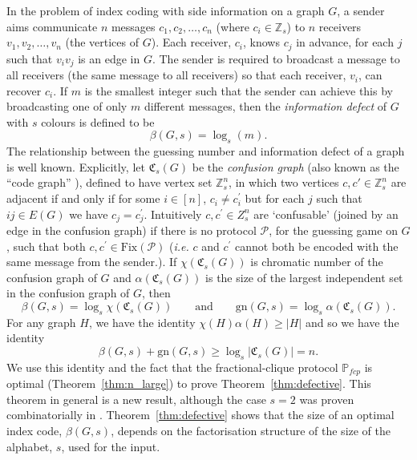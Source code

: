 \documentclass{birkjour}
\theoremstyle{indenteddefinition}
\theoremstyle{indenteddefinition}
\numberwithin{equation}{section}
\newcommand{\C}{\mathfrak{C}}
\renewcommand{\P}{\mathbb{P}}
\renewcommand{\Pr}{\mathcal{P}}
\newcommand{\Z}{\mathbb{Z}}
\newcommand{\gn}{\mbox{gn}}
\newcommand{\Fix}{\mbox{Fix}}
\renewcommand{\b}{\beta}
\begin{document}
In the problem of index coding with side information on a graph $G$, a sender aims communicate $n$ messages $c_1,c_2, \ldots ,c_n$ (where $c_i \in \Z_s$) to $n$ receivers $v_1,v_2, \ldots ,v_n$ (the vertices of $G$). Each receiver, $c_i$, knows $c_j$ in advance, for each $j$ such that $v_iv_j$ is an edge in $G$. The sender is required to broadcast a message to all receivers (the same message to all receivers) so that each receiver, $v_i$, can recover $c_i$. If $m$ is the smallest integer such that the sender can achieve this by broadcasting one of only $m$ different messages, then the \emph{information defect} \cite{Riis2007graph} of $G$ with $s$ colours is defined to be 
	$$ \b(G,s)  = \log_s(m). $$
The relationship between the guessing number and information defect of a graph is well known. 
Explicitly, let $\C _s(G)$ be the \emph{confusion graph} \cite{Alon2008broadcasting,bar2011index} (also known as the ``code graph'' \cite{Christofides2011guessing}), defined to have vertex set $\Z_s^n$, in which two vertices $c,c' \in \Z_s^n$ are adjacent if and only if for some $i \in [n]$, $c_i \neq c_i^\prime$ but for each $j$ such that $ij \in E(G)$ we have $c_j=c_j^\prime$. 
Intuitively $c,c^\prime \in Z_s^n$ are `confusable' (joined by an edge in the confusion graph) if there is no protocol $\Pr$, for the guessing game on $G$, such that both $c,c^\prime \in \Fix(\Pr)$ (\emph{i.e.} $c$ and $c^\prime$ cannot both be encoded with the same message from the sender.).
If $\chi(\C_s(G))$ is chromatic number of the confusion graph of $G$ and $\alpha(\C_s(G))$ is the size of the largest independent set in the confusion graph of $G$, then 
	$$ \b(G,s) = \log_s \chi(\C_s(G)) \qquad \mbox{and} \qquad \gn(G,s) = \log_s \alpha(\C_s(G)). $$ 
For any graph $H$, we have the identity $\chi(H)\alpha(H) \geq |H|$ and so we have the identity \cite{Riis2007graph}
	$$ \b(G,s) + \gn(G,s) \geq \log_s \left| \C_s(G) \right| = n. $$
We use this identity and the fact that the fractional-clique protocol $\P_{fcp}$ is optimal (Theorem~\ref{thm:n_large}) to prove Theorem~\ref{thm:defective}. This theorem in general is a new result, although the case $s=2$ was proven combinatorially in \cite{bar2011index}. Theorem~\ref{thm:defective} shows that the size of an optimal index code, $\b(G,s)$, depends on the factorisation structure of the size of the alphabet, $s$, used for the input. 
\end{document}
